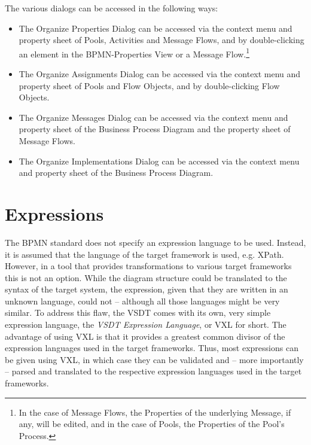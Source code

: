 The various dialogs can be accessed in the following ways:
\begin{itemize}
	\item The Organize Properties Dialog can be accessed via the context menu and
	property sheet of Pools, Activities and Message Flows, and by double-clicking
	an element in the BPMN-Properties View or a Message Flow.\footnote{In the
	case of Message Flows, the Properties of the underlying Message, if any, will
	be edited, and in the case of Pools, the Properties of the Pool's Process.}
	
	\item The Organize Assignments Dialog can be accessed via the context menu
	and property sheet of Pools and Flow Objects, and by double-clicking Flow
	Objects.
	
	\item The Organize Messages Dialog can be accessed via the context menu and
	property sheet of the Business Process Diagram and the property sheet of
	Message Flows.
	
	\item The Organize Implementations Dialog can be accessed via the context
	menu and property sheet of the Business Process Diagram.
	
\end{itemize}



\section{Expressions}
\label{sec:user_features_exp}

The BPMN standard does not specify an expression language to be used.  Instead,
it is assumed that the language of the target framework is used, e.g.  XPath.
However, in a tool that provides transformations to various target frameworks
this is not an option.  While the diagram structure could be translated to the
syntax of the target system, the expression, given that they are written in an
unknown language, could not -- although all those languages might be very similar.
To address this flaw, the VSDT comes with its own, very simple expression language,
the \emph{VSDT Expression Language}, or VXL for short.  The advantage of using
VXL is that it provides a greatest common divisor of the expression languages
used in the target frameworks.  Thus, most expressions can be given using VXL, in
which case they can be validated and -- more importantly -- parsed and translated
to the respective expression languages used in the target frameworks.

